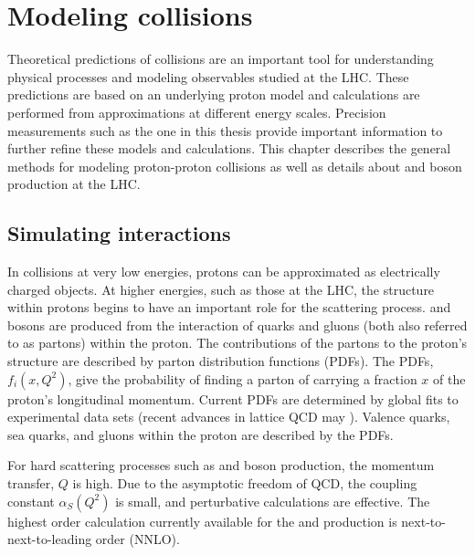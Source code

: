 \section{Modeling \pp collisions}
Theoretical predictions of \pp collisions are an important tool for understanding physical processes and modeling observables studied at the LHC. These predictions are based on an underlying proton model and calculations are performed from approximations at different energy scales. Precision measurements such as the one in this thesis provide important information to further refine these models and calculations. This chapter describes the general methods for modeling proton-proton collisions as well as details about \W and \Z boson production at the LHC.
\subsection{Simulating \pp interactions}
In collisions at very low energies, protons can be approximated as electrically charged objects. At higher energies, such as those at the LHC, the structure within protons begins to have an important role for the scattering process. \W and \Z bosons are produced from the interaction of quarks and gluons (both also referred to as partons) within the proton\cite{PhysRevLett.23.930,PhysRevLett.23.935}. The contributions of the partons to the proton's structure are described by parton distribution functions (PDFs). The PDFs, $f_i(x,Q^2)$, give the probability of finding a parton of carrying a fraction $x$ of the proton's longitudinal momentum. Current PDFs are determined by global fits to experimental data sets\cite{Perez_2013} (recent advances in lattice QCD may ). Valence quarks, sea quarks, and gluons within the proton are described by the PDFs. 

For hard scattering processes such as \W and \Z boson production, the momentum transfer, $Q$ is high. Due to the asymptotic freedom of QCD, the coupling constant $\alpha_S(Q^2)$ is small, and perturbative calculations are effective. The highest order calculation currently available for the \W and \Z production is next-to-next-to-leading order (NNLO)\cite{Anastasiou:2003ds}. 

